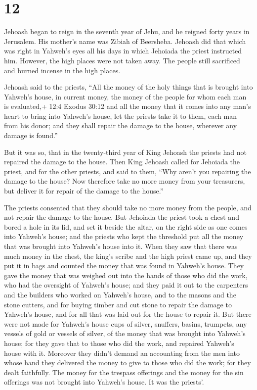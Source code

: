\hypertarget{section-11}{%
\section{12}\label{section-11}}

 Jehoash began to reign in the seventh year of Jehu, and he
reigned forty years in Jerusalem. His mother's name was Zibiah of
Beersheba.  Jehoash did that which was right in Yahweh's
eyes all his days in which Jehoiada the priest instructed him.
 However, the high places were not taken away. The people
still sacrificed and burned incense in the high places.

 Jehoash said to the priests, ``All the money of the holy
things that is brought into Yahweh's house, in current money, the money
of the people for whom each man is evaluated,+ 12:4 Exodus 30:12 and all
the money that it comes into any man's heart to bring into Yahweh's
house,  let the priests take it to them, each man from his
donor; and they shall repair the damage to the house, wherever any
damage is found.''

 But it was so, that in the twenty-third year of King
Jehoash the priests had not repaired the damage to the house.
 Then King Jehoash called for Jehoiada the priest, and for
the other priests, and said to them, ``Why aren't you repairing the
damage to the house? Now therefore take no more money from your
treasurers, but deliver it for repair of the damage to the house.''

 The priests consented that they should take no more money
from the people, and not repair the damage to the house. 
But Jehoiada the priest took a chest and bored a hole in its lid, and
set it beside the altar, on the right side as one comes into Yahweh's
house; and the priests who kept the threshold put all the money that was
brought into Yahweh's house into it.  When they saw that
there was much money in the chest, the king's scribe and the high priest
came up, and they put it in bags and counted the money that was found in
Yahweh's house.  They gave the money that was weighed out
into the hands of those who did the work, who had the oversight of
Yahweh's house; and they paid it out to the carpenters and the builders
who worked on Yahweh's house,  and to the masons and the
stone cutters, and for buying timber and cut stone to repair the damage
to Yahweh's house, and for all that was laid out for the house to repair
it.  But there were not made for Yahweh's house cups of
silver, snuffers, basins, trumpets, any vessels of gold or vessels of
silver, of the money that was brought into Yahweh's house; 
for they gave that to those who did the work, and repaired Yahweh's
house with it.  Moreover they didn't demand an accounting
from the men into whose hand they delivered the money to give to those
who did the work; for they dealt faithfully.  The money for
the trespass offerings and the money for the sin offerings was not
brought into Yahweh's house. It was the priests'.

